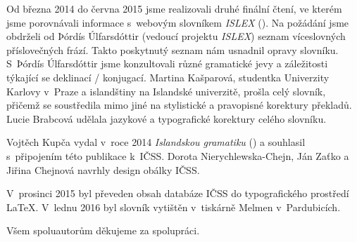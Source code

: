 Od března 2014 do června 2015 jsme realizovali druhé finální čtení, ve kterém jsme porovnávali informace s~webovým slovníkem \textit{ISLEX} (\cite {int1}). 
Na požádání jsme obdrželi od Þórdís Úlfarsdóttir (vedoucí projektu \textit{ISLEX}) seznam víceslovných příslovečných frází. Takto poskytnutý seznam nám usnadnil opravy slovníku. 
S~Þórdís Úlfarsdóttir jsme konzultovali různé gramatické jevy a záležitosti týkající se deklinací / konjugací.
Martina Kašparová, studentka Univerzity Karlovy v~Praze a islandštiny na Islandské univerzitě, prošla celý slovník, přičemž se soustředila mimo jiné na stylistické a pravopisné korektury překladů. 
Lucie Brabcová udělala jazykové a typografické korektury celého slovníku.

Vojtěch Kupča vydal v~roce 2014 \textit{Islandskou gramatiku} (\cite {is77}) a souhlasil s~připojením této publikace k~IČSS.
Dorota Nierychlewska-Chejn, Ján Zaťko a Jiřina Chejnová navrhly design obálky IČSS.

V~prosinci 2015 byl převeden obsah databáze IČSS do typografického prostředí {\LaTeX}. V~lednu 2016 byl slovník vytištěn v~tiskárně Melmen v~Pardubicích.

\blspace[5]

{\centering Všem spoluautorům děkujeme za spolupráci.\par}
